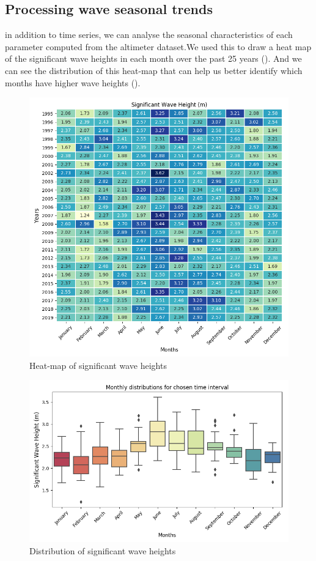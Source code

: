 \documentclass[12pt]{article}
\begin{document}
\newpage

\subsection{Processing wave seasonal trends}
in addition to time series, we can analyse the seasonal characteristics of each parameter computed from the altimeter dataset.We used this to draw a heat map of the significant wave heights in each month over the past 25 years (). And we can see the distribution of this heat-map that can help us better identify which months have higher wave heights (). 

\begin{figure}[h]
    \centering
    \includegraphics[width=10 cm]{whall_wh_heatmap.png}
    \caption{Heat-map of significant wave heights}
    \label{fig:fig5}
\end{figure}

\begin{figure}[h]
    \centering
    \includegraphics[width=6.5 cm]{whall_wh_distribution.png}
    \caption{Distribution of significant wave heights}
    \label{fig:fig6}
\end{figure}
\end{document}
